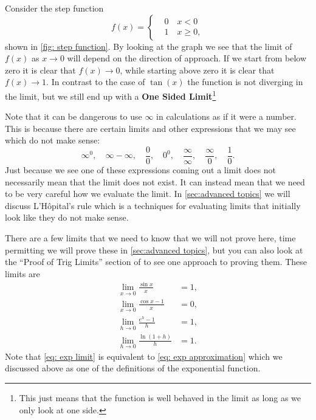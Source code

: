 \begin{ex}
Consider the step function
\begin{equation}
f(x)=\begin{cases}
&0 \quad x < 0\\
&1 \quad x\geq 0,
\end{cases}
\label{eq: step function}
\end{equation}
shown in \cref{fig: step function}. By looking at the graph we see that the limit of $f(x)$ as $x\to 0$ will depend on the direction of approach. If we start from below zero it is clear that $f(x)\to 0$, while starting above zero it is clear that $f(x)\to 1$. In contrast to the case of $\tan(x)$ the function is not diverging in the limit, but we still end up with a \textbf{One Sided Limit}\footnote{This just means that the function is well behaved in the limit as long as we only look at one side. }
\end{ex} 



\begin{mdiv}
Note that it can be dangerous to use $\infty$ in calculations as if it were a number. This is because there are certain limits and other expressions that we may see which do not make sense:
\begin{equation*}
\infty^{0}, \quad \infty-\infty, \quad \frac{0}{0}, \quad 0^{0}, \quad \frac{\infty}{\infty}, \quad \frac{\infty}{0}, \quad \frac{1}{0}.
\end{equation*}
Just because we see one of these expressions coming out a limit does not necessarily mean that the limit does not exist. It can instead mean that we need to be very careful how we evaluate the limit. In \cref{sec:advanced topics} we will discuss L'H\^{o}pital's rule which is a techniques for evaluating limits that initially look like they do not make sense.
\end{mdiv}

There are a few limits that we need to know that we will not prove here, time permitting we will prove these in \cref{sec:advanced topics}, but you can also look at the ``Proof of Trig Limits'' section of \cite{calcI} to see one approach to proving them. These limits are
\begin{align}
\lim_{x\to 0}\frac{\sin x}{x}&=1, \label{eq: sin limit}\\
\lim_{x\to 0}\frac{\cos x -1}{x}&=0, \label{eq: cos limit}\\
\lim_{h\to 0}\frac{e^{h}-1}{h}&=1, \label{eq: exp limit}\\
\lim_{h\to 0}\frac{\ln(1+h)}{h}&=1. \label{eq: ln limit}
\end{align}
Note that \cref{eq: exp limit} is equivalent to \cref{eq: exp approximation} which we discussed above as one of the definitions of the exponential function.

